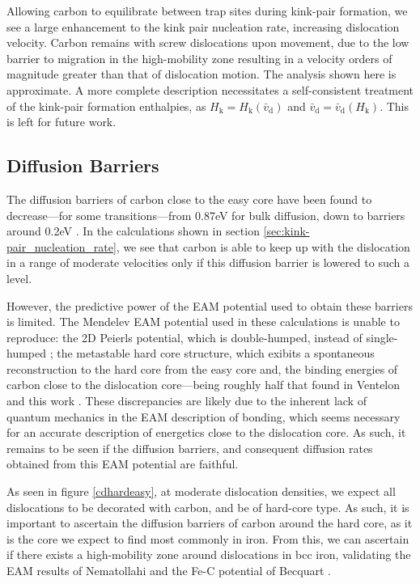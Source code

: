 \documentclass[a4paper,12pt,oneside,print,numbered,index,PageStyleIII]{PhDThesisPSnPDF}
\begin{document}
\begin{enumerate}
Allowing carbon to equilibrate between trap sites during kink-pair formation, we see a
large enhancement to the kink pair nucleation rate, increasing dislocation
velocity. Carbon remains with screw dislocations upon movement, due to the low barrier
to migration in the high-mobility zone resulting in a velocity orders of magnitude
greater than that of dislocation motion. The analysis shown here is approximate. A
more complete description necessitates a self-consistent treatment of the kink-pair
formation enthalpies, as \(H_{\text{k}} = H_{\text{k}}(\bar{v}_{\text{d}})\) and
\(\bar{v}_{\text{d}} = \bar{v}_{\text{d}}(H_{\text{k}})\). This is left for future work.
\end{enumerate}




\subsection{Diffusion Barriers}
\label{sec:org1ebf45f}

The diffusion barriers of carbon close to the easy core have been found to decrease---for some
transitions---from 0.87eV for bulk diffusion, down to barriers around 0.2eV
\cite{Nematollahi2016}. In the calculations shown in section \ref{sec:kink-pair_nucleation_rate}, we
see that carbon is able to keep up with the dislocation in a range of moderate velocities only if this
diffusion barrier is lowered to such a level.

However, the predictive power of the EAM potential used to obtain these barriers is limited. The
Mendelev EAM potential used in these calculations is unable to reproduce: the 2D Peierls
potential, which is double-humped, instead of single-humped \cite{Mendelev2003}; the metastable
hard core structure, which exibits a spontaneous reconstruction to the hard core from the easy core and, the binding energies of
carbon close to the dislocation core---being roughly half that found in Ventelon and this work
\cite{Becquart2007,Ventelon2015}. These discrepancies are likely due to the inherent lack of
quantum mechanics in the EAM description of bonding, which seems necessary for an accurate
description of energetics close to the dislocation core. As such, it remains to be seen if the
diffusion barriers, and consequent diffusion rates obtained from this EAM potential are faithful.

As seen in figure \ref{cdhardeasy}, at moderate dislocation densities, we expect all dislocations
to be decorated with carbon, and be of hard-core type. As such, it is important to ascertain the
diffusion barriers of carbon around the hard core, as it is the core we expect to find most
commonly in iron. From this, we can ascertain if there exists a high-mobility zone around
dislocations in bcc iron, validating the EAM results of Nematollahi and the Fe-C potential of Becquart \cite{Nematollahi2016,Becquart2007}.
\end{document}
